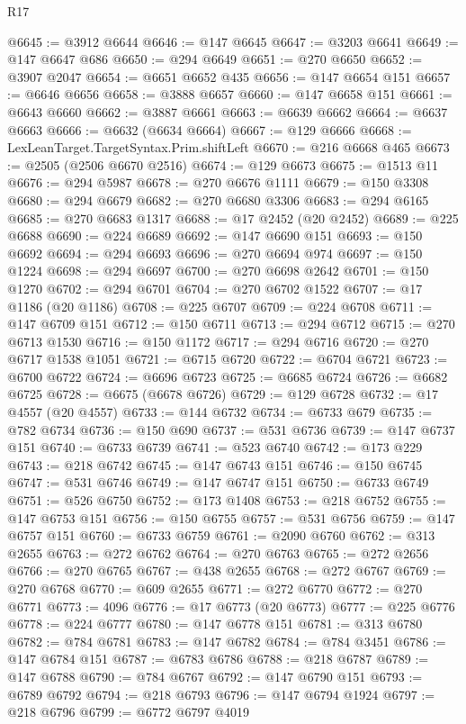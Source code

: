 \begin{lexlean}{R17}
\begin{coremodule}
@6645 := @3912 @6644
@6646 := @147 @6645
@6647 := @3203 @6641
@6649 := @147 @6647 @686
@6650 := @294 @6649
@6651 := @270 @6650
@6652 := @3907 @2047
@6654 := @6651 @6652 @435
@6656 := @147 @6654 @151
@6657 := @6646 @6656
@6658 := @3888 @6657
@6660 := @147 @6658 @151
@6661 := @6643 @6660
@6662 := @3887 @6661
@6663 := @6639 @6662
@6664 := @6637 @6663
@6666 := @6632 (@6634 @6664)
@6667 := @129 @6666
@6668 := LexLeanTarget.TargetSyntax.Prim.shiftLeft
@6670 := @216 @6668 @465
@6673 := @2505 (@2506 @6670 @2516)
@6674 := @129 @6673
@6675 := @1513 @11
@6676 := @294 @5987
@6678 := @270 @6676 @1111
@6679 := @150 @3308
@6680 := @294 @6679
@6682 := @270 @6680 @3306
@6683 := @294 @6165
@6685 := @270 @6683 @1317
@6688 := @17 @2452 (@20 @2452)
@6689 := @225 @6688
@6690 := @224 @6689
@6692 := @147 @6690 @151
@6693 := @150 @6692
@6694 := @294 @6693
@6696 := @270 @6694 @974
@6697 := @150 @1224
@6698 := @294 @6697
@6700 := @270 @6698 @2642
@6701 := @150 @1270
@6702 := @294 @6701
@6704 := @270 @6702 @1522
@6707 := @17 @1186 (@20 @1186)
@6708 := @225 @6707
@6709 := @224 @6708
@6711 := @147 @6709 @151
@6712 := @150 @6711
@6713 := @294 @6712
@6715 := @270 @6713 @1530
@6716 := @150 @1172
@6717 := @294 @6716
@6720 := @270 @6717 @1538 @1051
@6721 := @6715 @6720
@6722 := @6704 @6721
@6723 := @6700 @6722
@6724 := @6696 @6723
@6725 := @6685 @6724
@6726 := @6682 @6725
@6728 := @6675 (@6678 @6726)
@6729 := @129 @6728
@6732 := @17 @4557 (@20 @4557)
@6733 := @144 @6732
@6734 := @6733 @679
@6735 := @782 @6734
@6736 := @150 @690
@6737 := @531 @6736
@6739 := @147 @6737 @151
@6740 := @6733 @6739
@6741 := @523 @6740
@6742 := @173 @229
@6743 := @218 @6742
@6745 := @147 @6743 @151
@6746 := @150 @6745
@6747 := @531 @6746
@6749 := @147 @6747 @151
@6750 := @6733 @6749
@6751 := @526 @6750
@6752 := @173 @1408
@6753 := @218 @6752
@6755 := @147 @6753 @151
@6756 := @150 @6755
@6757 := @531 @6756
@6759 := @147 @6757 @151
@6760 := @6733 @6759
@6761 := @2090 @6760
@6762 := @313 @2655
@6763 := @272 @6762
@6764 := @270 @6763
@6765 := @272 @2656
@6766 := @270 @6765
@6767 := @438 @2655
@6768 := @272 @6767
@6769 := @270 @6768
@6770 := @609 @2655
@6771 := @272 @6770
@6772 := @270 @6771
@6773 := 4096
@6776 := @17 @6773 (@20 @6773)
@6777 := @225 @6776
@6778 := @224 @6777
@6780 := @147 @6778 @151
@6781 := @313 @6780
@6782 := @784 @6781
@6783 := @147 @6782
@6784 := @784 @3451
@6786 := @147 @6784 @151
@6787 := @6783 @6786
@6788 := @218 @6787
@6789 := @147 @6788
@6790 := @784 @6767
@6792 := @147 @6790 @151
@6793 := @6789 @6792
@6794 := @218 @6793
@6796 := @147 @6794 @1924
@6797 := @218 @6796
@6799 := @6772 @6797 @4019

\end{coremodule}
\end{lexlean}
